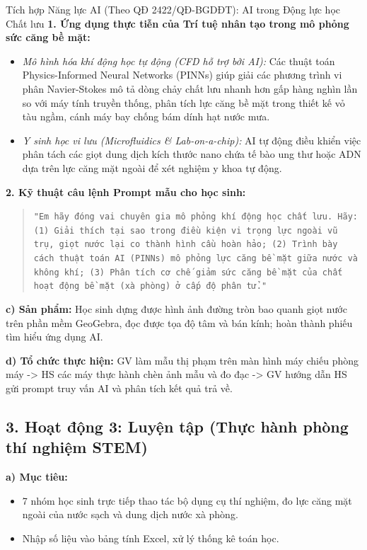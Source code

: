 \documentclass[12pt, a4paper]{article}
\begin{document}
\begin{aibox}{Tích hợp Năng lực AI (Theo QĐ 2422/QĐ-BGDĐT): AI trong Động lực học Chất lưu}
    \textbf{1. Ứng dụng thực tiễn của Trí tuệ nhân tạo trong mô phỏng sức căng bề mặt:}
    \begin{itemize}
        \item \textit{Mô hình hóa khí động học tự động (CFD hỗ trợ bởi AI):} Các thuật toán Physics-Informed Neural Networks (PINNs) giúp giải các phương trình vi phân Navier-Stokes mô tả dòng chảy chất lưu nhanh hơn gấp hàng nghìn lần so với máy tính truyền thống, phân tích lực căng bề mặt trong thiết kế vỏ tàu ngầm, cánh máy bay chống bám dính hạt nước mưa.
        \item \textit{Y sinh học vi lưu (Microfluidics \& Lab-on-a-chip):} AI tự động điều khiển việc phân tách các giọt dung dịch kích thước nano chứa tế bào ung thư hoặc ADN dựa trên lực căng mặt ngoài để xét nghiệm y khoa tự động.
    \end{itemize}
    \textbf{2. Kỹ thuật câu lệnh Prompt mẫu cho học sinh:}
    \begin{quote}
        \small \texttt{"Em hãy đóng vai chuyên gia mô phỏng khí động học chất lưu. Hãy: (1) Giải thích tại sao trong điều kiện vi trọng lực ngoài vũ trụ, giọt nước lại co thành hình cầu hoàn hảo; (2) Trình bày cách thuật toán AI (PINNs) mô phỏng lực căng bề mặt giữa nước và không khí; (3) Phân tích cơ chế giảm sức căng bề mặt của chất hoạt động bề mặt (xà phòng) ở cấp độ phân tử."}
    \end{quote}
\end{aibox}

\noindent \textbf{c) Sản phẩm:}
Học sinh dựng được hình ảnh đường tròn bao quanh giọt nước trên phần mềm GeoGebra, đọc được tọa độ tâm và bán kính; hoàn thành phiếu tìm hiểu ứng dụng AI.

\noindent \textbf{d) Tổ chức thực hiện:}
GV làm mẫu thị phạm trên màn hình máy chiếu phòng máy -> HS các máy thực hành chèn ảnh mẫu và đo đạc -> GV hướng dẫn HS gửi prompt truy vấn AI và phân tích kết quả trả về.

\subsection*{3. Hoạt động 3: Luyện tập (Thực hành phòng thí nghiệm STEM)}

\noindent \textbf{a) Mục tiêu:}
\begin{itemize}
    \item 7 nhóm học sinh trực tiếp thao tác bộ dụng cụ thí nghiệm, đo lực căng mặt ngoài của nước sạch và dung dịch nước xà phòng.
    \item Nhập số liệu vào bảng tính Excel, xử lý thống kê toán học.
\end{itemize}
\end{document}
